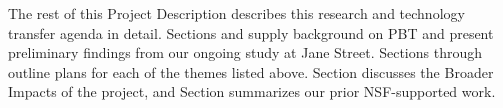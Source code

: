\medskip

The rest of this Project Description describes this research and
technology transfer agenda in detail.  Sections
 and  supply
background on PBT and present preliminary findings from our
ongoing study at Jane Street.
%
Sections  through
 outline plans for each of the
themes listed above.
Section 
discusses the Broader Impacts of the project, and
Section  summarizes our prior
NSF-supported work.

\iflater
{}
\fi



